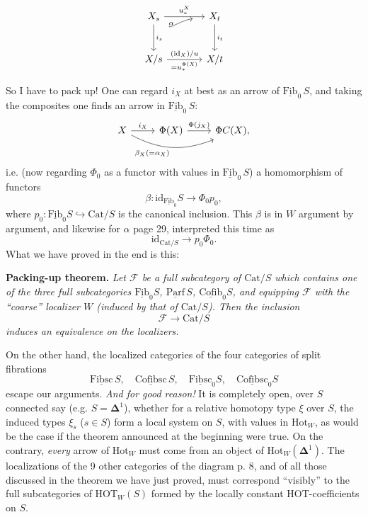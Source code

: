 \documentclass[11pt]{article}
\newcommand{\printedpage}[1]{\marginpar{\footnotesize p.~#1}}
\newcommand{\msp}[1]{\marginpar{\footnotesize [#1]}}
\newcommand{\uu}[1]{\underline{\mathrm{#1}}}
\begin{document}
\printedpage{19}

\[
\begin{tikzcd}[row sep=large, column sep=large]
X_s \arrow[r, "u_*^X"] \arrow[d, "i_s"] & X_t \arrow[d, "i_t"] \\
X/s \arrow[r, "(\mathrm{id}_X)/u", "= u_*^{\Phi(X)}"'] \arrow[ur, bend left=30, shorten <=28pt, shorten >=12pt, "\alpha"] & X/t
\end{tikzcd}
\]

\msp{page 31}
So I have to pack up! One can regard $i_X$ at best as an arrow of $\uu{Fib}_0\, S$, and taking the composites one finds an arrow in $\uu{Fib}_0\, S$:
\[
\begin{tikzcd}
X \arrow[r, "i_X"] \arrow[rr, bend right=25, "\beta_X(=\alpha_X)"'] & \Phi(X) \arrow[r, "\Phi(j_X)"] & \Phi C(X),
\end{tikzcd}
\]
i.e. (now regarding $\Phi_0$ as a functor with values in $\uu{Fib}_0\, S$) a homomorphism of functors
\[
\beta : \mathrm{id}_{\uu{Fib}_0} S \longrightarrow \Phi_0 p_0, %
\]
where $p_0 : \uu{Fib}_0 S \hookrightarrow \mathrm{Cat}/S$ is the canonical inclusion. This $\beta$ is in $W$ argument by argument, and likewise for $\alpha$ page 29, interpreted this time as
\[
\mathrm{id}_{\mathrm{Cat}/S} \longrightarrow p_0\Phi_0.
\]
What we have proved in the end is this:

\textbf{Packing-up theorem.} \textit{Let $\mathcal{F}$ be a full subcategory of $\mathrm{Cat}/S$ which contains one of the three full subcategories $\uu{Fib}_0 S$, $\uu{Parf}\, S$, $\uu{Cofib}_0 S$, and equipping $\mathcal{F}$ with the ``coarse'' localizer $W$ (induced by that of $\mathrm{Cat}/S$). Then the inclusion}
\[
\mathcal{F} \longrightarrow \mathrm{Cat}/S
\]
\textit{induces an equivalence on the localizers.}

\msp{page 32}
On the other hand, the localized categories of the four categories of split fibrations
\[
\uu{Fibsc}\, S, \quad \uu{Cofibsc}\, S, \quad \uu{Fibsc}_0 S, \quad \uu{Cofibsc}_0 S
\]
escape our arguments. \textit{And for good reason!} It is completely open, over $S$ connected say (e.g. $S = \mathbf{\Delta}^1$), whether for a relative homotopy type $\xi$ over $S$, the induced types $\xi_s$ ($s \in S$) form a local system on $S$, with values in $\mathrm{Hot}_W$, as would be the case if the theorem announced at the beginning were true. On the contrary, \textit{every} arrow of $\mathrm{Hot}_W$ must come from an object of $\mathrm{Hot}_W(\mathbf{\Delta}^1)$. The localizations of the 9 other categories of the diagram p. 8, and of all those discussed in the theorem we have just proved, must correspond ``visibly'' to the full subcategories of $\mathrm{HOT}_W(S)$ formed by the locally constant HOT-coefficients on $S$.
\end{document}
